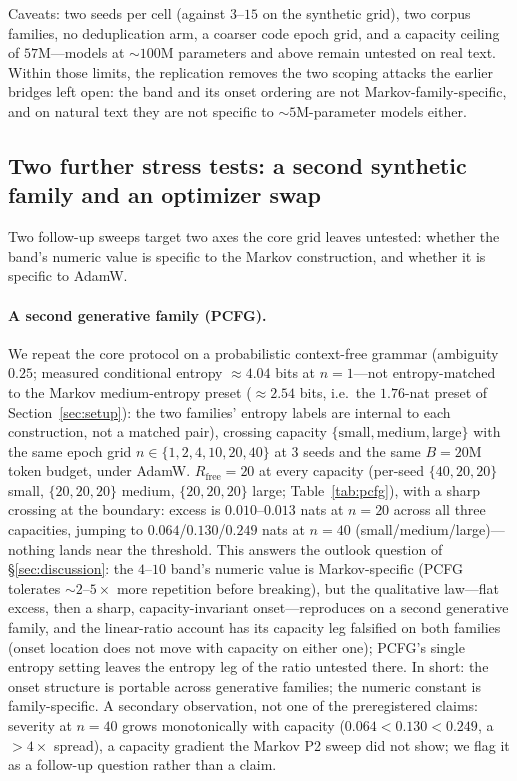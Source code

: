 \documentclass[11pt]{article}
\begin{document}
Caveats: two seeds per cell (against $3$--$15$ on the synthetic grid), two corpus
families, no deduplication arm, a coarser code epoch grid, and a capacity ceiling
of $57$M---models at ${\sim}100$M parameters and above remain untested on real
text. Within those limits, the replication removes the two scoping attacks the
earlier bridges left open: the band and its onset ordering are not
Markov-family-specific, and on natural text they are not specific to
${\sim}5$M-parameter models either.

\subsection{Two further stress tests: a second synthetic family and an optimizer swap}\label{sec:pcfgmuon}

Two follow-up sweeps target two axes the core grid leaves untested: whether the band's
numeric value is specific to the Markov construction, and whether it is specific to
AdamW.

\paragraph{A second generative family (PCFG).}
We repeat the core protocol on a probabilistic context-free grammar (ambiguity
$0.25$; measured conditional entropy ${\approx}4.04$ bits at $n{=}1$---not
entropy-matched to the Markov medium-entropy preset (${\approx}2.54$ bits, i.e.\ the $1.76$-nat preset of Section~\ref{sec:setup}): the two
families' entropy labels are internal to each construction, not a matched pair),
crossing capacity $\{\text{small}, \text{medium}, \text{large}\}$ with the same
epoch grid $n\in\{1,2,4,10,20,40\}$ at 3 seeds and the same $B{=}20$M token budget,
under AdamW. $R_{\mathrm{free}}=20$ at every capacity (per-seed $\{40,20,20\}$
small, $\{20,20,20\}$ medium, $\{20,20,20\}$ large; Table~\ref{tab:pcfg}), with a
sharp crossing at the boundary: excess is $0.010$--$0.013$ nats at $n=20$ across all
three capacities, jumping to $0.064$/$0.130$/$0.249$ nats at $n=40$
(small/medium/large)---nothing lands near the threshold. This answers the outlook
question of \S\ref{sec:discussion}: the $4$--$10$ band's numeric value is
Markov-specific (PCFG tolerates ${\sim}2$--$5\times$ more repetition before
breaking), but the qualitative law---flat excess, then a sharp, capacity-invariant
onset---reproduces on a second generative family, and the linear-ratio account
has its capacity leg falsified on both families (onset location does not move with capacity on
either one); PCFG's single entropy setting leaves the entropy leg of the ratio untested
there. In short: the onset structure is portable across generative families; the
numeric constant is family-specific. A secondary observation, not one of the preregistered claims: severity
at $n=40$ grows monotonically with capacity ($0.064<0.130<0.249$, a ${>}4\times$
spread), a capacity gradient the Markov P2 sweep did not show; we flag it as a
follow-up question rather than a claim.
\end{document}
